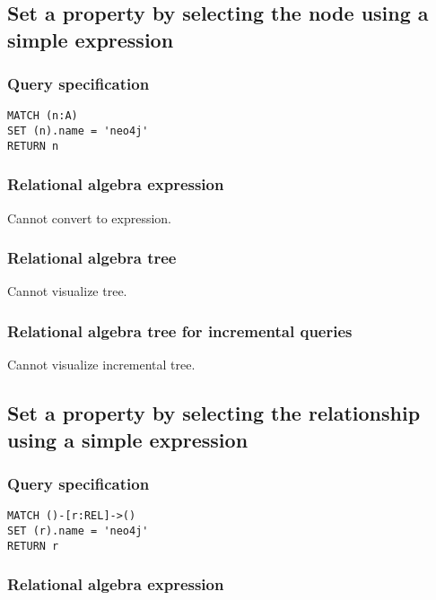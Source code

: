 \subsection{Set a property by selecting the node using a simple expression}

\subsubsection*{Query specification}

\begin{lstlisting}
MATCH (n:A)
SET (n).name = 'neo4j'
RETURN n
\end{lstlisting}

\subsubsection*{Relational algebra expression}

Cannot convert to expression.

\subsubsection*{Relational algebra tree}

Cannot visualize tree.

\subsubsection*{Relational algebra tree for incremental queries}

Cannot visualize incremental tree.

\subsection{Set a property by selecting the relationship using a simple expression}

\subsubsection*{Query specification}

\begin{lstlisting}
MATCH ()-[r:REL]->()
SET (r).name = 'neo4j'
RETURN r
\end{lstlisting}

\subsubsection*{Relational algebra expression}

